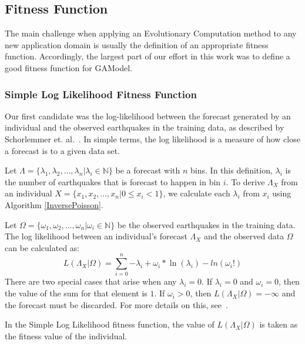 \documentclass{sig-alternate}
\begin{document}

\subsection{Fitness Function}

The main challenge when applying an Evolutionary Computation method to
any new application domain is usually the definition of an appropriate
fitness function. Accordingly, the largest part of our effort in this
work was to define a good fitness function for GAModel.

\subsubsection{Simple Log Likelihood Fitness Function} %

Our first candidate was the log-likelihood between the forecast
generated by an individual and the observed earthquakes in the
training data, as described by Schorlemmer
et. al.~\cite{Schorlemmer2007}. In simple terms, the log likelihood is
a measure of how close a forecast is to a given data set.

Let $\Lambda = \{\lambda_1, \lambda_2, \dots, \lambda_n | \lambda_i
\in \mathbb{N}\}$ be a forecast with $n$ bins. In this definition,
$\lambda_i$ is the number of earthquakes that is forecast to happen in
bin $i$. To derive $\Lambda_X$ from an individual $X = \{x_1, x_2,
\dots, x_n | 0 \leq x_i < 1\}$, we calculate each $\lambda_i$ from
$x_i$ using Algorithm \ref{InversePoisson}.

Let $\Omega = \{\omega_1, \omega_2, \dots, \omega_n | \omega_i \in
\mathbb{N}\}$ be the observed earthquakes in the training data. The
log likelihood between an individual's forecast $\Lambda_X$ and the
observed data $\Omega$ can be calculated as:
\begin{equation}
  L(\Lambda_X|\Omega) = \sum_{i=0}^n {-\lambda_i +
    \omega_i*\ln(\lambda_i)-ln(\omega_i!)}
\end{equation}
There are two special cases that arise when any $\lambda_i = 0$. If
$\lambda_i = 0$ and $\omega_i = 0$, then the value of the sum for that
element is $1$. If $\omega_i > 0$, then $L(\Lambda_X|\Omega) =
-\infty$ and the forecast must be discarded. For more details on
this, see~\cite{Schorlemmer2007}.

In the Simple Log Likelihood fitness function, the value of
$L(\Lambda_X|\Omega)$ is taken as the fitness value of the individual.
\end{document}
